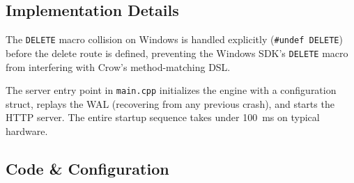 \documentclass[11pt,a4paper]{article}
\begin{document}
\subsection{Implementation Details}

The \texttt{DELETE} macro collision on Windows is handled explicitly
(\texttt{\#undef DELETE}) before the delete route is defined, preventing the
Windows SDK's \texttt{DELETE} macro from interfering with Crow's method-matching DSL.

The server entry point in \texttt{main.cpp} initializes the engine with
a configuration struct, replays the WAL (recovering from any previous crash),
and starts the HTTP server. The entire startup sequence takes under 100~ms
on typical hardware.

\subsection{Code \& Configuration}
\end{document}
